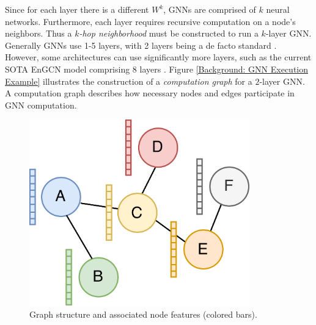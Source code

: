 Since for each layer there is a different $W^k$, GNNs are comprised of $k$ neural networks. Furthermore, each layer requires recursive computation on a node's neighbors. Thus a \textit{$k$-hop neighborhood} must be constructed to run a $k$-layer GNN.
Generally GNNs use 1-5 layers, with 2 layers being a de facto standard \cite{Survey_First_2022}. However, some architectures can use significantly more layers, such as the current SOTA EnGCN model comprising 8 layers \cite{EnGCN_2023}.
Figure \ref{Background: GNN Execution Example} illustrates the construction of a \textit{computation graph} for a $2$-layer GNN. A computation graph describes how necessary nodes and edges participate in GNN computation.


\begin{figure}[h!]
    \begin{minipage}[c]{0.5\textwidth}
        \centering
        \includegraphics[width=0.85\textwidth]{diagrams/group_meeting_gnn-Graph structure.png}    
        \caption{Graph structure and associated node features (colored bars).}
    \end{minipage}
    \hfill
    \begin{minipage}[c]{0.45\textwidth}
        \centering

\end{minipage}
\end{figure}
